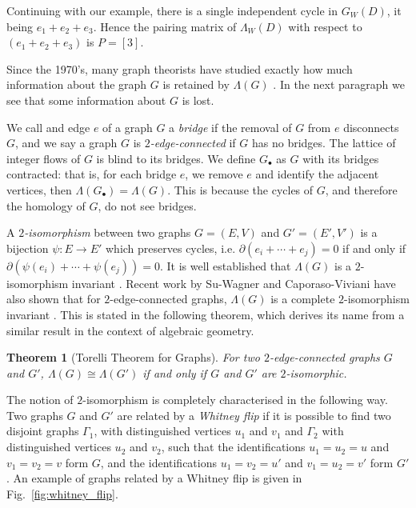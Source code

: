 \documentclass[12pt]{report}
\newtheorem*{theorem}{Theorem}
\begin{document}
Continuing with our example, there is a single independent cycle in $G_{W}(D)$, it being $e_{1} + e_{2} + e_{3}$. Hence the pairing matrix of $\Lambda_{W}(D)$ with respect to $( e_{1} + e_{2} + e_{3})$ is $P = [3]$.

Since the 1970's, many graph theorists have studied exactly how much information about the graph $G$ is retained by $\Lambda(G)$ \parencite{lattice-of-flows-cuts, torelli-for-graphs-tropical-curves, lattice-of-flows-regular-matroid}. In the next paragraph we see that some information about $G$ is lost.

We call and edge $e$ of a graph $G$ a \textit{bridge} if the removal of $G$ from $e$ disconnects $G$, and we say a graph $G$ is \textit{$2$-edge-connected} if $G$ has no bridges. The lattice of integer flows of $G$ is blind to its bridges. We define $G_{\bullet}$ as $G$ with its bridges contracted: that is, for each bridge $e$, we remove $e$ and identify the adjacent vertices, then $\Lambda(G_{\bullet}) = \Lambda(G)$. This is because the cycles of $G$, and therefore the homology of $G$, do not see bridges.

A \textit{$2$-isomorphism} between two graphs $G = (E, V)$ and $G' = (E', V')$ is a bijection \({\psi: E \longrightarrow E'}\) which preserves cycles, i.e. $\partial(e_{i} + \cdots + e_{j}) = 0$ if and only if $\partial\left(\psi(e_{i}) + \cdots + \psi(e_{j})\right) = 0$. It is well established that $\Lambda(G)$ is a $2$-isomorphism invariant \parencite{lattice-of-flows-cuts}. Recent work by Su-Wagner and Caporaso-Viviani have also shown that for $2$-edge-connected graphs, $\Lambda(G)$ is a complete $2$-isomorphism invariant \cites[Theorem 3.1.1]{torelli-for-graphs-tropical-curves}[Theorem 1]{lattice-of-flows-regular-matroid}. This is stated in the following theorem, which derives its name from a similar result in the context of algebraic geometry.


\begin{theorem}[Torelli Theorem for Graphs]
For two $2$-edge-connected graphs $G$ and $G'$, $\Lambda(G) \cong \Lambda(G')$ if and only if $G$ and $G'$ are $2$-isomorphic.
\end{theorem}

The notion of $2$-isomorphism is completely characterised in the following way. Two graphs $G$ and $G'$ are related by a \textit{Whitney flip} if it is possible to find two disjoint graphs $\Gamma_{1}$, with distinguished vertices $u_{1}$ and $v_{1}$ and $\Gamma_{2}$ with distinguished vertices $u_{2}$ and $v_{2}$, such that the identifications $u_{1} = u_{2} = u$ and $v_{1} = v_{2} = v$ form $G$, and the identifications $u_{1} = v_{2} = u'$ and $v_{1} = u_{2} = v'$ form $G'$. An example of graphs related by a Whitney flip is given in Fig.~\ref{fig:whitney_flip}.
\end{document}
